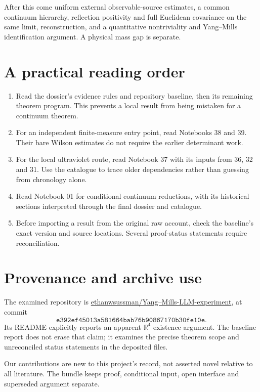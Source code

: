 After this come uniform external
observable-source estimates, a common
continuum hierarchy, reflection positivity
and full Euclidean covariance on the
same limit, reconstruction, and a
quantitative nontriviality and
Yang--Mills identification argument.
A physical mass gap is separate.

\section*{A practical reading order}

\begin{enumerate}
\item Read the dossier's evidence rules and
repository baseline, then its remaining
theorem program. This prevents a local
result from being mistaken for a
continuum theorem.
\item For an independent finite-measure
entry point, read Notebooks 38 and 39.
Their bare Wilson estimates do not
require the earlier determinant work.
\item For the local ultraviolet route,
read Notebook 37 with its inputs from
36, 32 and 31. Use the catalogue to
trace older dependencies rather than
guessing from chronology alone.
\item Read Notebook 01 for conditional
continuum reductions, with its
historical sections interpreted through
the final dossier and catalogue.
\item Before importing a result from
the original raw account, check the
baseline's exact version and source
locations. Several proof-status
statements require reconciliation.
\end{enumerate}

\section*{Provenance and archive use}

The examined repository is
\href{https://github.com/ethanwsussman/Yang--Mills-LLM-experiment}
{ethanwsussman/Yang--Mills-LLM-experiment},
at commit
\[
 \texttt{e392ef45013a581664bab76b90867170b30fe10e}.
\]
Its README explicitly reports an apparent
\(\mathbb R^4\) existence argument. The
baseline report does not erase that
claim; it examines the precise theorem
scope and unreconciled status statements
in the deposited files.

Our contributions are new to this
project's record, not asserted novel
relative to all literature. The bundle
keeps proof, conditional input, open
interface and superseded argument
separate.

